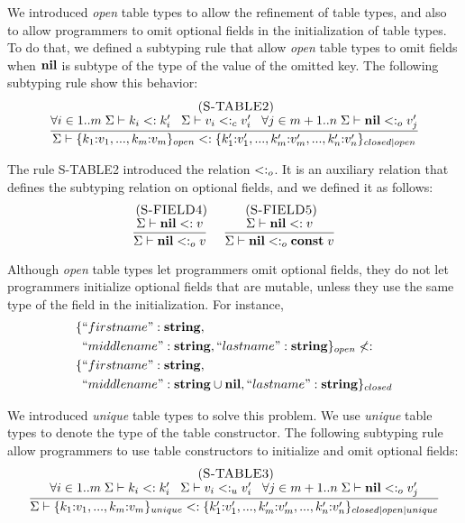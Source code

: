 We introduced \emph{open} table types to allow the refinement
of table types, and also to allow programmers to omit optional
fields in the initialization of table types.
To do that, we defined a subtyping rule that allow \emph{open}
table types to omit fields when $\mathbf{nil}$ is subtype of the type of
the value of the omitted key.
The following subtyping rule show this behavior:
\[
\begin{array}{c}
\; (\textsc{S-TABLE2})\\
\dfrac{\forall i \in 1..m \; \Sigma \vdash k_{i} <: k_{i}' \;\;\;
       \Sigma \vdash v_{i} <:_{c} v_{i}' \;\;\;
       \forall j \in m+1..n \; \Sigma \vdash \mathbf{nil} <:_{o} v_{j}'}
      {\Sigma \vdash \{k_{1}{:}v_{1}, ..., k_{m}{:}v_{m}\}_{open} <:
                    \{k_{1}'{:}v_{1}', ..., k_{m}'{:}v_{m}', ..., k_{n}'{:}v_{n}'\}_{closed|open}}
\end{array}
\]

The rule \textsc{S-TABLE2} introduced the relation $<:_{o}$.
It is an auxiliary relation that defines the subtyping relation
on optional fields, and we defined it as follows:
\[
\begin{array}{c}
\begin{array}{c}
\; (\textsc{S-FIELD4})\\
\dfrac{\Sigma \vdash \mathbf{nil} <: v}
      {\Sigma \vdash \mathbf{nil} <:_{o} v}
\end{array}
\;
\begin{array}{c}
\; (\textsc{S-FIELD5})\\
\dfrac{\Sigma \vdash \mathbf{nil} <: v}
      {\Sigma \vdash \mathbf{nil} <:_{o} \mathbf{const} \; v}
\end{array}
\end{array}
\]

Although \emph{open} table types let programmers omit optional fields,
they do not let programmers initialize optional fields that are
mutable, unless they use the same type of the field in the initialization.
For instance,
\begin{align*}
\{ & ``firstname":\mathbf{string},\\
   & ``middlename":\mathbf{string}, ``lastname":\mathbf{string} \}_{open} \not <: \\
\{ & ``firstname":\mathbf{string}, \\
   & ``middlename":\mathbf{string} \cup \mathbf{nil}, ``lastname":\mathbf{string} \}_{closed}
\end{align*}

We introduced \emph{unique} table types to solve this problem.
We use \emph{unique} table types to denote the type of the
table constructor.
The following subtyping rule allow programmers to use table constructors
to initialize and omit optional fields:
\[
\begin{array}{c}
\; (\textsc{S-TABLE3})\\
\dfrac{\forall i \in 1..m \; \Sigma \vdash k_{i} <: k_{i}' \;\;\;
       \Sigma \vdash v_{i} <:_{u} v_{i}' \;\;\;
       \forall j \in m+1..n \; \Sigma \vdash \mathbf{nil} <:_{o} v_{j}'}
      {\Sigma \vdash \{k_{1}{:}v_{1}, ..., k_{m}{:}v_{m}\}_{unique} <:
                    \{k_{1}'{:}v_{1}', ..., k_{m}'{:}v_{m}', ..., k_{n}'{:}v_{n}'\}_{closed|open|unique}}
\end{array}
\]

